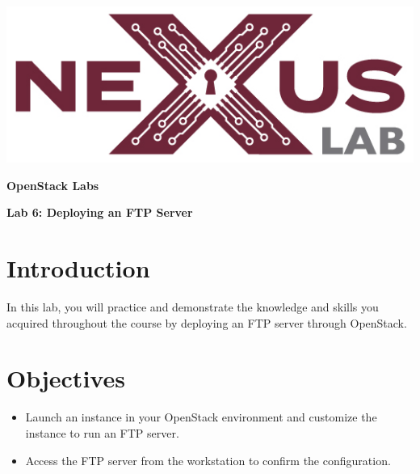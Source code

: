 \documentclass[letterpaper, 12pt]{article}
\begin{document}
\begin{titlepage}
    \centering
    \includegraphics[scale=0.5]{images/nexus_lab_logo.png}

    \vspace*{\baselineskip}

    \textbf{\Large OpenStack Labs}

    \vspace*{\baselineskip}

    \textbf{\Large Lab 6: Deploying an FTP Server}
    \vspace*{\fill}
\end{titlepage}

{
    \fancyhf{}
    \fancyfoot[R]{\footnotesize\thepage}
    \renewcommand{\headrulewidth}{0pt}
}

\pagestyle{fancy}
\tableofcontents
\clearpage

\section*{Introduction}
\label{sec:introduction}
In this lab, you will practice and demonstrate the knowledge and skills you acquired throughout the course by deploying
an FTP server through OpenStack.

\section*{Objectives}
\label{sec:objectives}
\begin{itemize}[itemsep=0pt]
    \item Launch an instance in your OpenStack environment and customize the instance to run an FTP server.
    \item Access the FTP server from the workstation to confirm the configuration.
\end{itemize}
\clearpage
\end{document}
